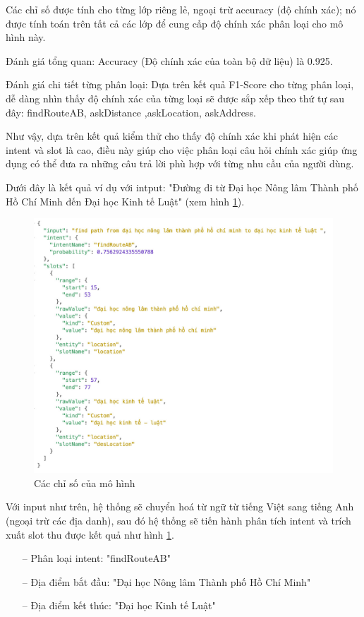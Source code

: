 Các chỉ số được tính cho từng lớp riêng lẻ, ngoại trừ accuracy (độ chính xác); nó được tính toán trên tất cả các lớp để cung cấp độ chính xác phân loại cho mô hình này.

Đánh giá tổng quan: Accuracy (Độ chính xác của toàn bộ dữ liệu) là 0.925.

Đánh giá chi tiết từng phân loại: Dựa trên kết quả F1-Score cho từng phân loại, dễ dàng nhìn thấy độ chính xác của từng loại sẽ được sắp xếp theo thứ tự sau đây: findRouteAB, askDistance ,askLocation, askAddress.

Như vậy, dựa trên kết quả kiểm thử cho thấy độ chính xác khi phát hiện các intent và slot là cao, điều này giúp cho việc phân loại câu hỏi chính xác giúp ứng dụng có thể đưa ra những câu trả lời phù hợp với từng nhu cầu của người dùng.

Dưới đây là kết quả ví dụ với intput: "Đường đi từ Đại học Nông lâm Thành phố Hồ Chí Minh đến Đại học Kinh tế Luật" (xem hình \ref{fig:detect-intent}).

\begin{figure}[htp]
    \centering
    \includegraphics[width=15cm]{images/detect_intent.jpg}
    \caption{Các chỉ số của mô hình}
    \label{fig:detect-intent}
\end{figure}

Với input như trên, hệ thống sẽ chuyển hoá từ ngữ từ tiếng Việt sang tiếng Anh (ngoại trừ các địa danh), sau đó hệ thống sẽ tiến hành phân tích intent và trích xuất slot thu được kết quả như hình \ref{fig:detect-intent}.
\begin{itemize}
    \item[--] Phân loại intent: "findRouteAB"
    \item[--] Địa điểm bắt đầu: "Đại học Nông lâm Thành phố Hồ Chí Minh"
    \item[--] Địa điểm kết thúc: "Đại học Kinh tế Luật"
\end{itemize}

